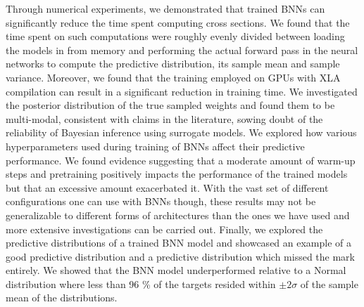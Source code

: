 Through numerical experiments, we demonstrated that trained BNNs can significantly reduce the time spent computing cross sections. We found that the time spent on such computations were roughly evenly divided between loading the models in from memory and performing the actual forward pass in the neural networks to compute the predictive distribution, its sample mean and sample variance. Moreover, we found that the training employed on GPUs with XLA compilation can result in a significant reduction in training time.
We investigated the posterior distribution of the true sampled weights and found them to be multi-modal, consistent with claims in the literature, sowing doubt of the reliability of Bayesian inference using surrogate models. We explored how various hyperparameters used during training of BNNs affect their predictive performance. We found evidence suggesting that a moderate amount of warm-up steps and pretraining positively impacts the performance of the trained models but that an excessive amount exacerbated it. With the vast set of different configurations one can use with BNNs though, these results may not be generalizable to different forms of architectures than the ones we have used and more extensive investigations can be carried out. Finally, we explored the predictive distributions of a trained BNN model and showcased an example of a good predictive distribution and a predictive distribution which missed the mark entirely. We showed that the BNN model underperformed relative to a Normal distribution where less than 96 \% of the targets resided within $\pm 2\sigma$ of the sample mean of the distributions. 

